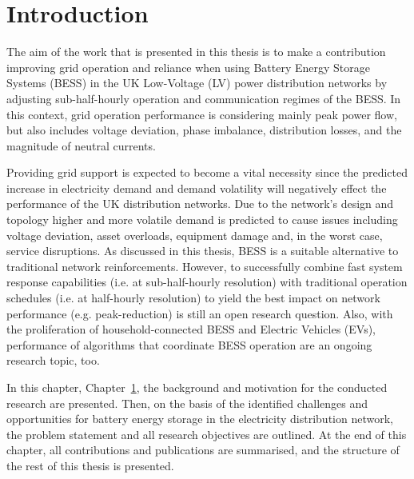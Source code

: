 \chapter{Introduction}
\label{ch-introduction}

The aim of the work that is presented in this thesis is to make a contribution improving grid operation and reliance when using Battery Energy Storage Systems (BESS) in the UK Low-Voltage (LV) power distribution networks by adjusting sub-half-hourly operation and communication regimes of the BESS.
In this context, grid operation performance is considering mainly peak power flow, but also includes voltage deviation, phase imbalance, distribution losses, and the magnitude of neutral currents.

Providing grid support is expected to become a vital necessity since the predicted increase in electricity demand and demand volatility will negatively effect the performance of the UK distribution networks.
Due to the network's design and topology higher and more volatile demand is predicted to cause issues including voltage deviation, asset overloads, equipment damage and, in the worst case, service disruptions.
As discussed in this thesis, BESS is a suitable alternative to traditional network reinforcements.
However, to successfully combine fast system response capabilities (i.e. at sub-half-hourly resolution) with traditional operation schedules (i.e. at half-hourly resolution) to yield the best impact on network performance (e.g. peak-reduction) is still an open research question.
Also, with the proliferation of household-connected BESS and Electric Vehicles (EVs), performance of algorithms that coordinate BESS operation are an ongoing research topic, too.

In this chapter, Chapter~\ref{ch-introduction}, the background and motivation for the conducted research are presented.
Then, on the basis of the identified challenges and opportunities for battery energy storage in the electricity distribution network, the problem statement and all research objectives are outlined.
At the end of this chapter, all contributions and publications are summarised, and the structure of the rest of this thesis is presented.









